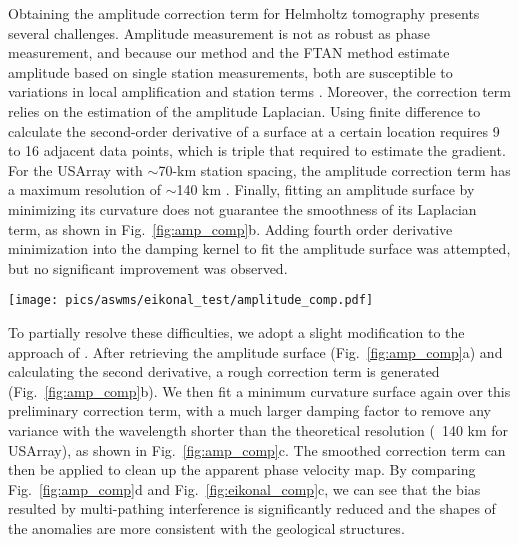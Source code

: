 Obtaining the amplitude correction term for Helmholtz tomography presents several challenges. Amplitude measurement is not as robust as phase measurement, and because our method and the FTAN method estimate amplitude based on single station measurements, both are susceptible to variations in local amplification and station terms \citep{Lin:2012bc,Eddy:2014io}. Moreover, the correction term relies on the estimation of the amplitude Laplacian. Using finite difference to calculate the second-order derivative of a surface at a certain location requires 9 to 16 adjacent data points, which is triple that required to estimate the gradient. For the USArray with $\sim$70-km station spacing, the amplitude correction term has a maximum resolution of $\sim$140 km \citep{Lin:2011fw}. Finally, fitting an amplitude surface by minimizing its curvature does not guarantee the smoothness of its Laplacian term, as shown in Fig.~\ref{fig:amp_comp}b. Adding fourth order derivative minimization into the damping kernel to fit the amplitude surface was attempted, but no significant improvement was observed.

\begin{figure*}
	\texttt{[image: pics/aswms/eikonal\_test/amplitude\_comp.pdf]}
	\caption{Demonstration of the amplitude-correction procedure on the apparent phase-velocity map in Fig.~\ref{fig:eikonal_comp}c. \textbf{a)} The amplitude map generated from the minimum-curvature surface interpolation. \textbf{b)} The preliminary correction term derived from a) via Helmholtz equation. \textbf{c)} The smoothed correction term. \textbf{d)} The corrected phase velocity map, derived from c) and Fig.~\ref{fig:eikonal_comp}c. }
	\label{fig:amp_comp}
\end{figure*}

To partially resolve these difficulties, we adopt a slight modification to the approach of \citet{Lin:2011fw}. After retrieving the amplitude surface (Fig.~\ref{fig:amp_comp}a) and calculating the second derivative, a rough correction term is generated (Fig.~\ref{fig:amp_comp}b). We then fit a minimum curvature surface again over this preliminary correction term, with a much larger damping factor to remove any variance with the wavelength shorter than the theoretical resolution (~140 km for USArray), as shown in Fig.~\ref{fig:amp_comp}c. The smoothed correction term can then be applied to clean up the apparent phase velocity map. By comparing Fig.~\ref{fig:amp_comp}d and Fig.~\ref{fig:eikonal_comp}c, we can see that the bias resulted by multi-pathing interference is significantly reduced and the shapes of the anomalies are more consistent with the geological structures. 


